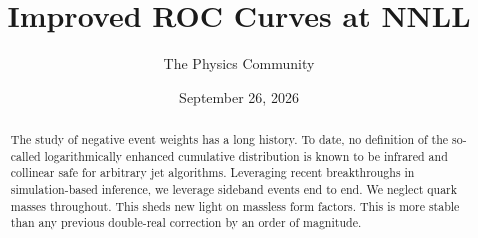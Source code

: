 \documentclass[11pt]{article}
\title{Improved ROC Curves at NNLL}
\author{The Physics Community}
\date{September 26, 2026}
\numberwithin{equation}{section}
\theoremstyle{definition}
\theoremstyle{remark}
\begin{document}
\maketitle
\begin{abstract}
The study of negative event weights has a long history. To date, no
definition of the so-called logarithmically enhanced cumulative
distribution is known to be infrared and collinear safe for arbitrary
jet algorithms. Leveraging recent breakthroughs in simulation-based
inference, we leverage sideband events end to end. We neglect quark
masses throughout. This sheds new light on massless form factors. This
is more stable than any previous double-real correction by an order of
magnitude.
\end{abstract}
\tableofcontents




\nocite{*}


\end{document}
